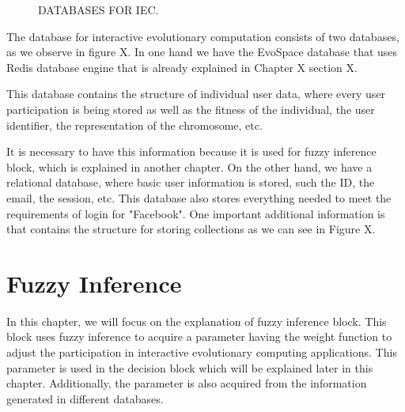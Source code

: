 \begin{figure}
\captionsetup{justification=centering,margin=2cm}
\centering
\setlength\fboxsep{0pt}
\setlength\fboxrule{0.7pt}
\caption{DATABASES FOR IEC.}
\label{fig:databases}       
\end{figure}



The database for interactive evolutionary computation consists of two databases, as we observe in figure X. In one hand we have the EvoSpace database that uses Redis database engine that is already explained in Chapter X section X.

This database contains the structure of individual user data, where every user participation is being stored as well as the fitness of the individual, the user identifier, the representation of the chromosome, etc. 

It is necessary to have this information because it is used for fuzzy inference block, which is explained in another chapter. On the other hand, we have a relational database, where basic user information is stored, such the ID, the email, the session, etc. This database also stores everything needed to meet the requirements of login for "Facebook". One important additional information is that contains the structure for storing collections as we can see in Figure X.

\section{Fuzzy Inference}
In this chapter, we will focus on the explanation of fuzzy inference block. This block uses fuzzy inference to acquire a parameter having the weight function to adjust the participation in interactive evolutionary computing applications. This parameter is used in the decision block which will be explained later in this chapter. Additionally, the parameter is also acquired from the information generated in different databases.

